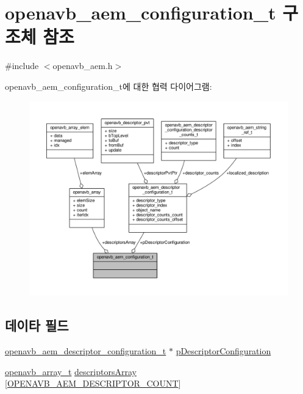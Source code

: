 \hypertarget{structopenavb__aem__configuration__t}{}\section{openavb\+\_\+aem\+\_\+configuration\+\_\+t 구조체 참조}
\label{structopenavb__aem__configuration__t}


{\ttfamily \#include $<$openavb\+\_\+aem.\+h$>$}



openavb\+\_\+aem\+\_\+configuration\+\_\+t에 대한 협력 다이어그램\+:
\nopagebreak
\begin{figure}[H]
\begin{center}
\leavevmode
\includegraphics[width=350pt]{structopenavb__aem__configuration__t__coll__graph}
\end{center}
\end{figure}
\subsection*{데이타 필드}
\begin{DoxyCompactItemize}
\item 
\hyperlink{structopenavb__aem__descriptor__configuration__t}{openavb\+\_\+aem\+\_\+descriptor\+\_\+configuration\+\_\+t} $\ast$ \hyperlink{structopenavb__aem__configuration__t_a4abea387cf415fe116337d5cc7daa7b0}{p\+Descriptor\+Configuration}
\item 
\hyperlink{openavb__array_8h_a43e0de981c90a3d7c9ddeb67fbf2a54e}{openavb\+\_\+array\+\_\+t} \hyperlink{structopenavb__aem__configuration__t_ac13acdbe38f2c36440cba7ef1a7aed17}{descriptors\+Array} \mbox{[}\hyperlink{openavb__aem__types__pub_8h_aa9f936b6eade681759b61f2a5e438137}{O\+P\+E\+N\+A\+V\+B\+\_\+\+A\+E\+M\+\_\+\+D\+E\+S\+C\+R\+I\+P\+T\+O\+R\+\_\+\+C\+O\+U\+NT}\mbox{]}
\end{DoxyCompactItemize}


